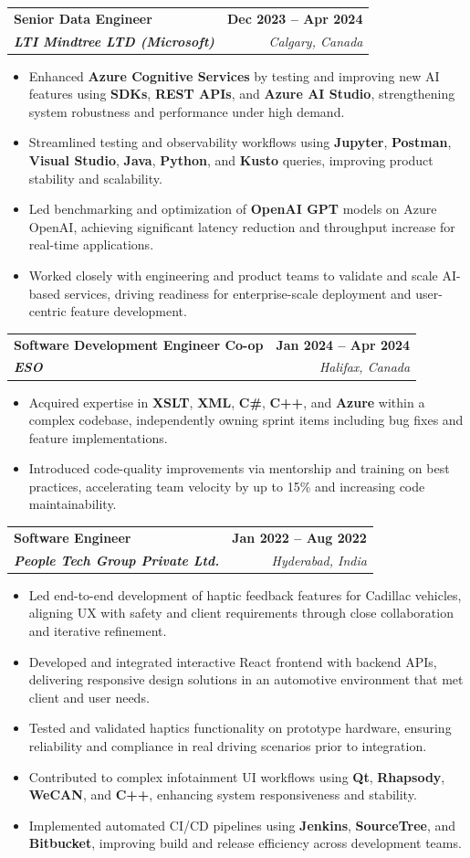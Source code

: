 \documentclass[letterpaper,11pt]{article}
\makeatletter
\newcommand{\resumeItem}[1]{
  \item\small{
    {#1 \vspace{-2pt}}
  }
}
\newcommand{\resumeSubheading}[4]{
  \vspace{-2pt}\item
    \begin{tabular*}{1.0\textwidth}[t]{l@{\extracolsep{\fill}}r}
      \textbf{#1} & \textbf{\small #2} \\
      \textit{\small#3} & \textit{\small #4} \\
    \end{tabular*}\vspace{-7pt}
}
\newcommand{\resumeItemListStart}{\begin{itemize}}
\newcommand{\resumeItemListEnd}{\end{itemize}\vspace{-5pt}}
\makeatother
\begin{document}
    \resumeSubheading
      {\textbf{Senior Data Engineer}}{\textbf{Dec 2023 -- Apr 2024}}
      {\textbf{LTI Mindtree LTD (Microsoft)}}{Calgary, Canada}
      \resumeItemListStart
        \resumeItem{Enhanced \textbf{Azure Cognitive Services} by testing and improving new AI features using \textbf{SDKs}, \textbf{REST APIs}, and \textbf{Azure AI Studio}, strengthening system robustness and performance under high demand.}
        \resumeItem{Streamlined testing and observability workflows using \textbf{Jupyter}, \textbf{Postman}, \textbf{Visual Studio}, \textbf{Java}, \textbf{Python}, and \textbf{Kusto} queries, improving product stability and scalability.}
        \resumeItem{Led benchmarking and optimization of \textbf{OpenAI GPT} models on Azure OpenAI, achieving significant latency reduction and throughput increase for real-time applications.}
        \resumeItem{Worked closely with engineering and product teams to validate and scale AI-based services, driving readiness for enterprise-scale deployment and user-centric feature development.}
      \resumeItemListEnd
    
    \resumeSubheading
      {\textbf{Software Development Engineer Co-op}}{\textbf{Jan 2024 -- Apr 2024}}
      {\textbf{ESO}}{Halifax, Canada}
      \resumeItemListStart
        \resumeItem{Acquired expertise in \textbf{XSLT}, \textbf{XML}, \textbf{C\#}, \textbf{C++}, and \textbf{Azure} within a complex codebase, independently owning sprint items including bug fixes and feature implementations.}
        \resumeItem{Introduced code-quality improvements via mentorship and training on best practices, accelerating team velocity by up to 15\% and increasing code maintainability.}
      \resumeItemListEnd

    \resumeSubheading
      {\textbf{Software Engineer}}{\textbf{Jan 2022 -- Aug 2022}}
      {\textbf{People Tech Group Private Ltd.}}{Hyderabad, India}
      \resumeItemListStart
        \resumeItem{Led end-to-end development of haptic feedback features for Cadillac vehicles, aligning UX with safety and client requirements through close collaboration and iterative refinement.}
        \resumeItem{Developed and integrated interactive React frontend with backend APIs, delivering responsive design solutions in an automotive environment that met client and user needs.}
        \resumeItem{Tested and validated haptics functionality on prototype hardware, ensuring reliability and compliance in real driving scenarios prior to integration.}
        \resumeItem{Contributed to complex infotainment UI workflows using \textbf{Qt}, \textbf{Rhapsody}, \textbf{WeCAN}, and \textbf{C++}, enhancing system responsiveness and stability.}
        \resumeItem{Implemented automated CI/CD pipelines using \textbf{Jenkins}, \textbf{SourceTree}, and \textbf{Bitbucket}, improving build and release efficiency across development teams.}
      \resumeItemListEnd
\end{document}
